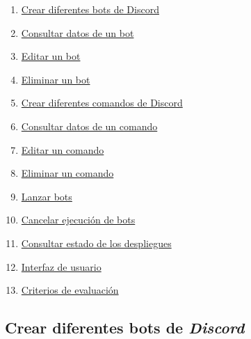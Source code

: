 \begin{enumerate}
	\item \href{https://github.com/harvestcore/matroos/issues/1}{Crear diferentes bots de Discord}
	\item \href{https://github.com/harvestcore/matroos/issues/2}{Consultar datos de un bot}
	\item \href{https://github.com/harvestcore/matroos/issues/3}{Editar un bot}
	\item \href{https://github.com/harvestcore/matroos/issues/4}{Eliminar un bot}
	\item \href{https://github.com/harvestcore/matroos/issues/5}{Crear diferentes comandos de Discord}
	\item \href{https://github.com/harvestcore/matroos/issues/6}{Consultar datos de un comando}
	\item \href{https://github.com/harvestcore/matroos/issues/7}{Editar un comando}
	\item \href{https://github.com/harvestcore/matroos/issues/8}{Eliminar un comando}
	\item \href{https://github.com/harvestcore/matroos/issues/9}{Lanzar bots}
	\item \href{https://github.com/harvestcore/matroos/issues/10}{Cancelar ejecución de bots}
	\item \href{https://github.com/harvestcore/matroos/issues/11}{Consultar estado de los despliegues}
	\item \href{https://github.com/harvestcore/matroos/issues/25}{Interfaz de usuario}
	\item \href{https://github.com/harvestcore/matroos/issues/39}{Criterios de evaluación}
\end{enumerate}


\subsection{Crear diferentes bots de \textit{Discord}}

